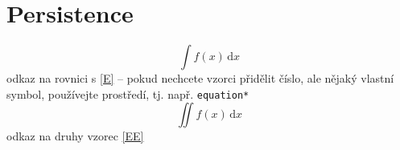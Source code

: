 \chapter{Persistence}
\graphicspath{ {/home/tomasp/Dokumenty/Master_Thesis/figures/} }

\begin{equation*}\label{E}\tag{rovnice}
 \int\! f(x)\,\mathrm{d}x
\end{equation*}
odkaz na rovnici s  \eqref{E} -- pokud nechcete vzorci přidělit číslo, ale nějaký vlastní symbol, používejte
 prostředí, tj. např. \verb+equation*+
\begin{equation}\label{EE}
 \iint\! f(x)\,\mathrm{d}x
\end{equation}
odkaz na druhy vzorec \eqref{EE}
